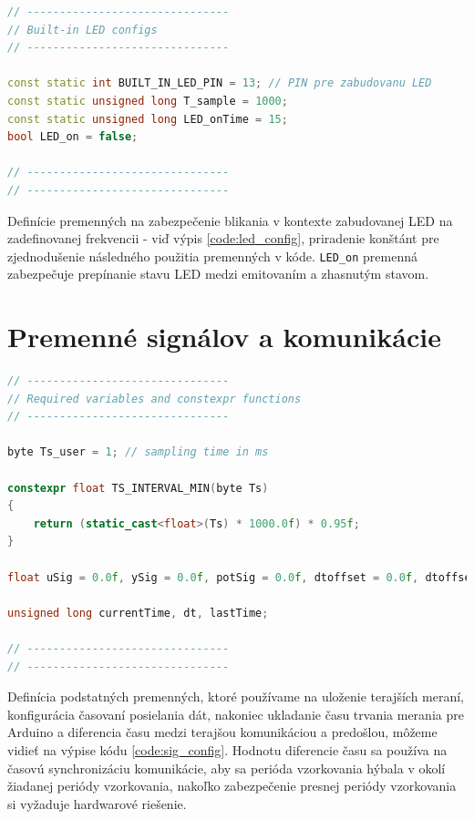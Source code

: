 \documentclass[a4paper, 10pt, ]{article}
\begin{document}
\begin{lstlisting}[caption=Definície premenných zabudovanej LED., label={code:led_config}, language=C++]
// -------------------------------
// Built-in LED configs
// -------------------------------

const static int BUILT_IN_LED_PIN = 13; // PIN pre zabudovanu LED
const static unsigned long T_sample = 1000;
const static unsigned long LED_onTime = 15;
bool LED_on = false;

// -------------------------------
// -------------------------------
\end{lstlisting}

Definície premenných na zabezpečenie blikania v kontexte zabudovanej LED na zadefinovanej frekvencii - viď výpis \ref{code:led_config}, priradenie konštánt pre zjednodušenie následného použitia premenných v kóde. \texttt{LED\_on} premenná zabezpečuje prepínanie stavu LED medzi emitovaním a zhasnutým stavom.

\section{Premenné signálov a komunikácie}

\begin{lstlisting}[caption=Definície premenných signálov a komunikácie., label={code:sig_config}, language=C++]
// -------------------------------
// Required variables and constexpr functions
// -------------------------------

byte Ts_user = 1; // sampling time in ms

constexpr float TS_INTERVAL_MIN(byte Ts)
{
    return (static_cast<float>(Ts) * 1000.0f) * 0.95f;
}

float uSig = 0.0f, ySig = 0.0f, potSig = 0.0f, dtoffset = 0.0f, dtoffset_interval = 0.0f; // control, output, reference, time offset

unsigned long currentTime, dt, lastTime;

// -------------------------------
// -------------------------------
\end{lstlisting}

Definícia podstatných premenných, ktoré používame na uloženie terajších meraní, konfigurácia časovaní posielania dát, nakoniec ukladanie času trvania merania pre Arduino a diferencia času medzi terajšou komunikáciou a predošlou, môžeme vidieť na výpise kódu \ref{code:sig_config}. Hodnotu diferencie času sa používa na časovú synchronizáciu komunikácie, aby sa perióda vzorkovania hýbala v okolí žiadanej periódy vzorkovania, nakoľko zabezpečenie presnej periódy vzorkovania si vyžaduje hardwarové riešenie.
\end{document}
